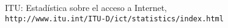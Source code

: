 \clearpage
{}
\begin{thebibliography}{15}
	ITU: Estadística sobre el acceso a Internet,
	\\\texttt{http://www.itu.int/ITU-D/ict/statistics/index.html}
\end{thebibliography}